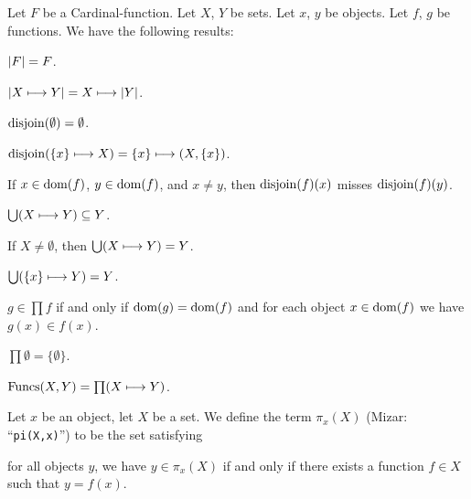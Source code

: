 \documentclass{article}
\begin{document}
Let $F$ be a Cardinal-function. Let $X$, $Y$ be sets. Let $x$, $y$ be objects.
Let $f$, $g$ be functions.
We have the following results:
\begin{thm}
\item\label{card3:1} $|F|=F$.
\item\label{card3:2} $|X\longmapsto Y|=X\longmapsto|Y|$.
\item\label{card3:3} $\operatorname{disjoin}(\emptyset)=\emptyset$.
\item\label{card3:4} $\operatorname{disjoin}(\{x\}\longmapsto X) = \{x\}\longmapsto(X,\{x\})$.
\item\label{card3:5} If $x\in\operatorname{dom}(f)$, $y\in\operatorname{dom}(f)$, and $x\neq y$,
  then $\operatorname{disjoin}(f)(x)$ misses $\operatorname{disjoin}(f)(y)$.
\item\label{card3:6} $\Union(X\constantto Y)\subset Y$.
\item\label{card3:7} If $X\neq\emptyset$, then $\Union(X\constantto Y)=Y$.
\item\label{card3:8} $\Union(\{x\}\constantto Y)=Y$.
\item\label{card3:9} $g\in\prod f$ if and only if $\operatorname{dom}(g)=\operatorname{dom}(f)$ and
  for each object $x\in\operatorname{dom}(f)$ we have $g(x)\in f(x)$.
\item\label{card3:10} $\prod\emptyset=\{\emptyset\}$.
\item\label{card3:11} $\operatorname{Funcs}(X,Y)=\prod(X\longmapsto Y)$.
\end{thm}

\begin{definition}
Let $x$ be an object, let $X$ be a set.
We define the term $\pi_{x}(X)$ (Mizar: ``\verb#pi(X,x)#'') to be the
set satisfying
\begin{defn}
\item for all objects $y$, we have $y\in\pi_{x}(X)$ if and only if there
  exists a function $f\in X$ such that $y=f(x)$.
\end{defn}
\end{definition}
\end{document}
